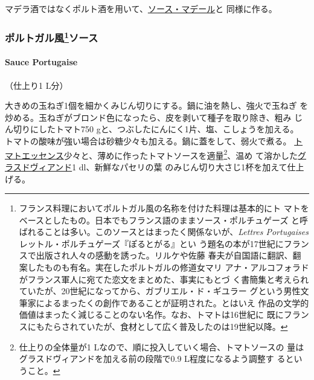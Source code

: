   

マデラ酒ではなくポルト酒を用いて、\protect\hyperlink{sauce-madere}{ソース・マデール}と
同様に作る。

\maeaki

\hypertarget{ux30ddux30ebux30c8ux30acux30ebux98a873ux30bdux30fcux30b9}{%
\subsubsection[ポルトガル風ソース]{\texorpdfstring{ポルトガル風\footnote{フランス料理においてポルトガル風の名称を付けた料理は基本的にト
  マトをベースとしたもの。日本でもフランス語のままソース・ポルチュゲーズ
  と呼ばれることは多い。このソースとはまったく関係ないが、\emph{Lettres
  Portugaises} レットル・ポルチュゲーズ『ぽるとがる』とい
  う題名の本が17世紀にフランスで出版され人々の感動を誘った。リルケや佐藤
  春夫が自国語に翻訳、翻案したものも有名。実在したポルトガルの修道女マリ
  アナ・アルコフォラドがフランス軍人に宛てた恋文をまとめた、事実にもとづ
  く書簡集と考えられていたが、20世紀になってから、ガブリエル・ド・ギユラー
  グという男性文筆家によるまったくの創作であることが証明された。とはいえ
  作品の文学的価値はまったく減じることのない名作。なお、トマトは16世紀に
  既にフランスにもたらされていたが、食材として広く普及したのは19世紀以降。}ソース}{ポルトガル風ソース}}\label{ux30ddux30ebux30c8ux30acux30ebux98a873ux30bdux30fcux30b9}}

\hypertarget{sauce-portugaise}{%
\paragraph{Sauce Portugaise}\label{sauce-portugaise}}

   

（仕上り1 L分）

大きめの玉ねぎ1個を細かくみじん切りにする。鍋に油を熱し、強火で玉ねぎ
を炒める。玉ねぎがブロンド色になったら、皮を剥いて種子を取り除き、粗み
じん切りにしたトマト750 gと、つぶしたにんにく1片、塩、こしょうを加える。
トマトの酸味が強い場合は砂糖少々も加える。鍋に蓋をして、弱火で煮る。
\href{}{トマトエッセンス}少々と、薄めに作ったトマトソースを適量\footnote{仕上りの全体量が1
  Lなので、順に投入していく場合、トマトソースの
  量はグラスドヴィアンドを加える前の段階で0.9 L程度になるよう調整す
  るということ。}、温め
て溶かした\protect\hyperlink{glace-de-viande}{グラスドヴィアンド}1
dl、新鮮なパセリの葉 のみじん切り大さじ1杯を加えて仕上げる。


